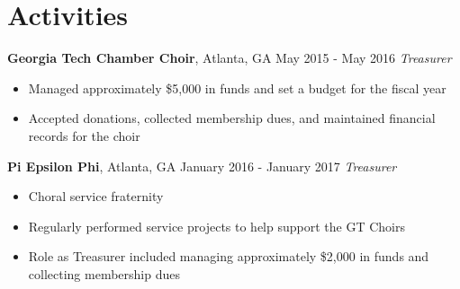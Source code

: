 \documentclass[10pt]{article}
\begin{document}
\section*{Activities}
\textbf{Georgia Tech Chamber Choir}, Atlanta, GA \hfill May 2015 - May 2016
\linebreak
\textit{Treasurer}
\begin{itemize}
    \item Managed approximately \$5,000 in funds and set a budget for the fiscal year
    \item Accepted donations, collected membership dues, and maintained financial records for the choir
\end{itemize}

\vspace{3pt}

\textbf{Pi Epsilon Phi}, Atlanta, GA \hfill January 2016 - January 2017
\linebreak
\textit{Treasurer}
\begin{itemize}
    \item Choral service fraternity
    \item Regularly performed service projects to help support the GT Choirs
    \item Role as Treasurer included managing approximately \$2,000 in funds and collecting membership dues
\end{itemize}
\end{document}
